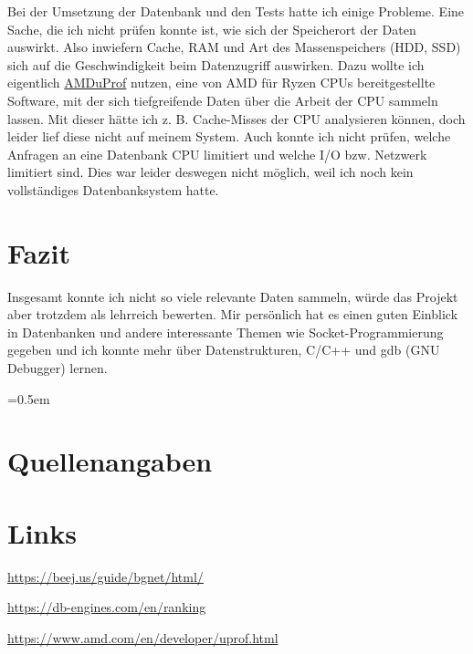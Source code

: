 \documentclass[11pt,a4paper]{article}
\begin{document}
Bei der Umsetzung der Datenbank und den Tests hatte ich einige Probleme.
Eine Sache, die ich nicht prüfen konnte ist, wie sich der Speicherort der Daten
auswirkt. Also inwiefern Cache, RAM und Art des Massenspeichers (HDD, SSD)
sich auf die Geschwindigkeit beim Datenzugriff auswirken.
Dazu wollte ich eigentlich \href{https://www.amd.com/en/developer/uprof.html}{AMDuProf}
nutzen, eine von AMD für Ryzen CPUs bereitgestellte Software, mit der sich tiefgreifende
Daten über die Arbeit der CPU sammeln lassen. Mit dieser hätte ich z. B. Cache-Misses
der CPU analysieren können, doch leider lief diese nicht auf meinem System.
Auch konnte ich nicht prüfen, welche Anfragen an eine Datenbank CPU limitiert
und welche I/O bzw. Netzwerk limitiert sind. Dies war leider deswegen nicht
möglich, weil ich noch kein vollständiges Datenbanksystem hatte.

\section{Fazit}

Insgesamt konnte ich nicht so viele relevante Daten sammeln, würde das Projekt aber
trotzdem als lehrreich bewerten. Mir persönlich hat es einen guten Einblick in
Datenbanken und andere interessante Themen wie Socket-Programmierung gegeben
und ich konnte mehr über Datenstrukturen, C/C++ und gdb (GNU Debugger) lernen.

\clearpage

\emergencystretch=0.5em

\section{Quellenangaben}

\section*{Links}

\url{https://beej.us/guide/bgnet/html/}

\url{https://db-engines.com/en/ranking}

\url{https://www.amd.com/en/developer/uprof.html}

\printbibliography[title={Literaturverzeichnis}]
\end{document}
